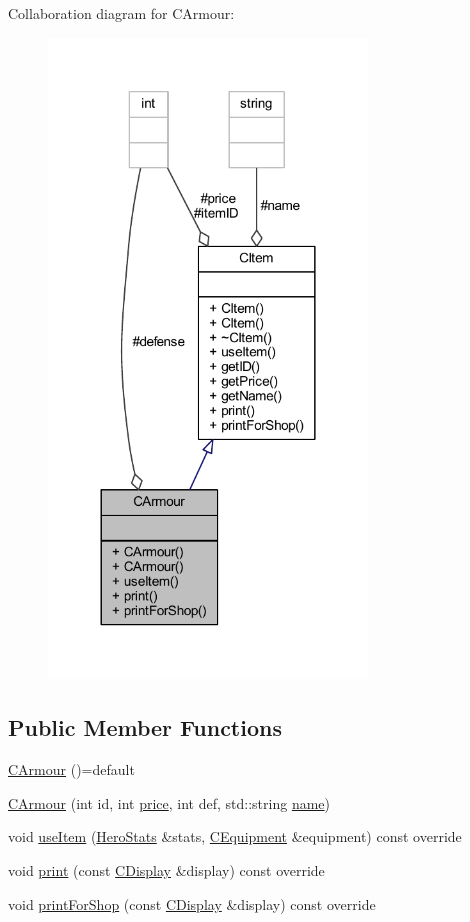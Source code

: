 Collaboration diagram for C\+Armour\+:\nopagebreak
\begin{figure}[H]
\begin{center}
\leavevmode
\includegraphics[width=240pt]{class_c_armour__coll__graph}
\end{center}
\end{figure}
\subsection*{Public Member Functions}
\begin{DoxyCompactItemize}
\item 
\mbox{\hyperlink{class_c_armour_a4d9522bb2d9b8c4d111a8a8c446d23a1}{C\+Armour}} ()=default
\item 
\mbox{\hyperlink{class_c_armour_a9bc0c6d2b7225cd2b15397006916cd1b}{C\+Armour}} (int id, int \mbox{\hyperlink{class_c_item_ad2512107bbbb688e9141a5d5ea6d47de}{price}}, int def, std\+::string \mbox{\hyperlink{class_c_item_a4d8b073203d9d09291e0fd07f4bcc479}{name}})
\item 
void \mbox{\hyperlink{class_c_armour_ab1000a6cfe419ca94b1254217fb707cd}{use\+Item}} (\mbox{\hyperlink{struct_hero_stats}{Hero\+Stats}} \&stats, \mbox{\hyperlink{class_c_equipment}{C\+Equipment}} \&equipment) const override
\item 
void \mbox{\hyperlink{class_c_armour_a169305bd938dfcf38365883b65312068}{print}} (const \mbox{\hyperlink{class_c_display}{C\+Display}} \&display) const override
\item 
void \mbox{\hyperlink{class_c_armour_a3abc5a20200d572d920737aec75bb196}{print\+For\+Shop}} (const \mbox{\hyperlink{class_c_display}{C\+Display}} \&display) const override
\end{DoxyCompactItemize}
